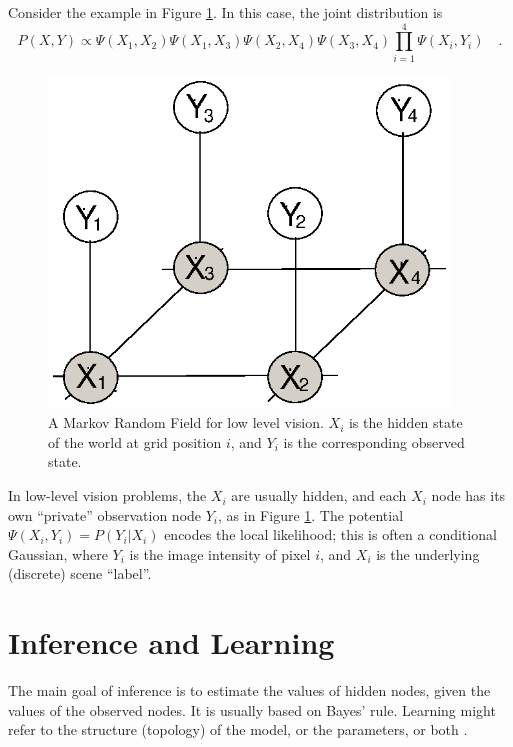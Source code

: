 \documentclass{article}
\begin{document}
Consider the example in Figure \ref{mrf}.  In this case, the joint distribution is
\begin{equation}
P(X,Y) \propto \Psi(X_1,X_2)\Psi(X_1,X_3)\Psi(X_2,X_4)\Psi(X_3,X_4)\prod_{i=1}^4\Psi(X_i,Y_i) \quad .
\end{equation}
\begin{figure}[h]
\centering
\includegraphics[trim=100 160 210 120,width=0.95\textwidth]{mrf.eps}
\caption{A Markov Random Field for low level vision. $X_i$ is the hidden state of the world at grid position
$i$, and $Y_i$ is the corresponding observed state.}\label{mrf}
\end{figure}

In low-level vision problems, the $X_i$ are usually hidden, and each $X_i$ node has its own
``private'' observation node $Y_i$, as in Figure \ref{mrf}.
The potential $\Psi(X_i,Y_i)=P(Y_i|X_i)$ encodes the local likelihood;
this is often a conditional Gaussian, where $Y_i$ is the image intensity of pixel $i$, and
$X_i$ is the underlying (discrete) scene ``label''.

\section{Inference and Learning}
The main goal of inference is to estimate the values of hidden nodes, given the values of the observed nodes.
It is usually based on Bayes' rule.
Learning might refer to the structure (topology) of the model, or the parameters, or both \cite{Murphy}.
\end{document}
